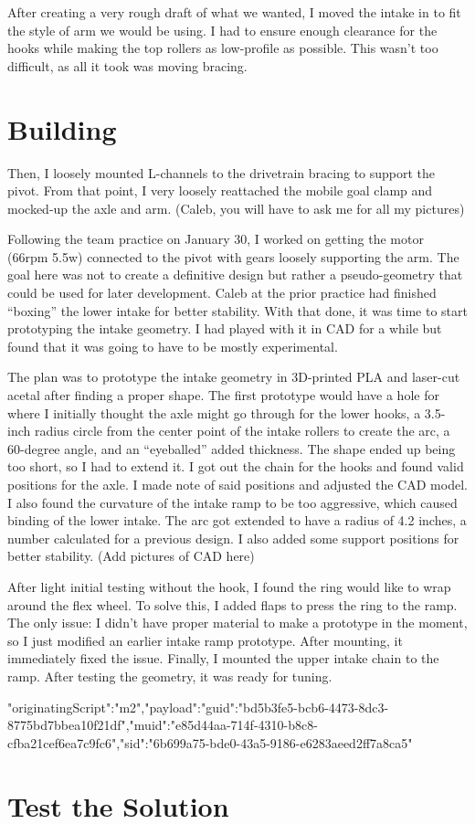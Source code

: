 After creating a very rough draft of what we wanted, I moved the intake in to fit the style of arm we would be using. I had to ensure enough clearance for the hooks while making the top rollers as low-profile as possible. This wasn’t too difficult, as all it took was moving bracing.

\section*{Building}
Then, I loosely mounted L-channels to the drivetrain bracing to support the pivot. From that point, I very loosely reattached the mobile goal clamp and mocked-up the axle and arm. (Caleb, you will have to ask me for all my pictures)

Following the team practice on January 30, I worked on getting the motor (66rpm 5.5w) connected to the pivot with gears loosely supporting the arm. The goal here was not to create a definitive design but rather a pseudo-geometry that could be used for later development. Caleb at the prior practice had finished “boxing” the lower intake for better stability. With that done, it was time to start prototyping the intake geometry. I had played with it in CAD for a while but found that it was going to have to be mostly experimental. 

The plan was to prototype the intake geometry in 3D-printed PLA and laser-cut acetal after finding a proper shape. The first prototype would have a hole for where I initially thought the axle might go through for the lower hooks, a 3.5-inch radius circle from the center point of the intake rollers to create the arc, a 60-degree angle, and an “eyeballed” added thickness. The shape ended up being too short, so I had to extend it. I got out the chain for the hooks and found valid positions for the axle. I made note of said positions and adjusted the CAD model. I also found the curvature of the intake ramp to be too aggressive, which caused binding of the lower intake. The arc got extended to have a radius of 4.2 inches, a number calculated for a previous design. I also added some support positions for better stability. (Add pictures of CAD here) 

After light initial testing without the hook, I found the ring would like to wrap around the flex wheel. To solve this, I added flaps to press the ring to the ramp. The only issue: I didn’t have proper material to make a prototype in the moment, so I just modified an earlier intake ramp prototype. After mounting, it immediately fixed the issue. Finally, I mounted the upper intake chain to the ramp. After testing the geometry, it was ready for tuning.

{"originatingScript":"m2","payload":{"guid":"bd5b3fe5-bcb6-4473-8dc3-8775bd7bbea10f21df","muid":"e85d44aa-714f-4310-b8c8-cfba21cef6ea7c9fc6","sid":"6b699a75-bde0-43a5-9186-e6283aeed2ff7a8ca5"}}

\chapterauthor{}
\section*{Test the Solution}
